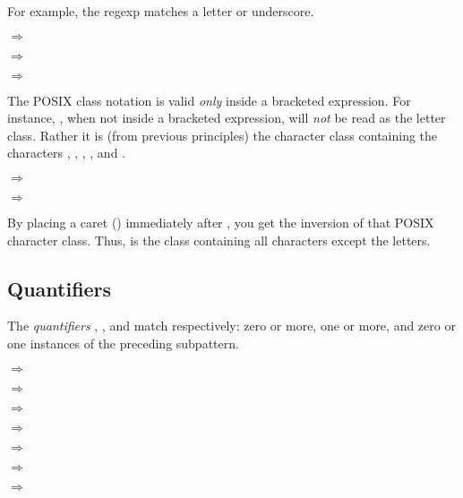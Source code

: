 For example, the regexp  matches a letter or
underscore.

 $\Rightarrow$ 

 $\Rightarrow$

 $\Rightarrow$ 

The POSIX class notation is valid \emph{only} inside a bracketed
expression.  For instance, \code{[:alpha:]}, when not inside a
bracketed expression, will \emph{not} be read as the letter class.
Rather it is (from previous principles) the character class containing
the characters \code{:}, , , , and .

 $\Rightarrow$ 

 $\Rightarrow$ 

By placing a caret (\code{\textasciicircum}) immediately after
\code{[:}, you get the inversion of that POSIX character class.  Thus,
   is the class containing all
  characters except the letters.

\subsection {Quantifiers}

The \emph{quantifiers} \code{*}, \code{+}, and
 match respectively: zero or more, one or more,
and zero or one instances of the preceding subpattern.

 $\Rightarrow$

 $\Rightarrow$

 $\Rightarrow$

 $\Rightarrow$

 $\Rightarrow$

 $\Rightarrow$

 $\Rightarrow$

